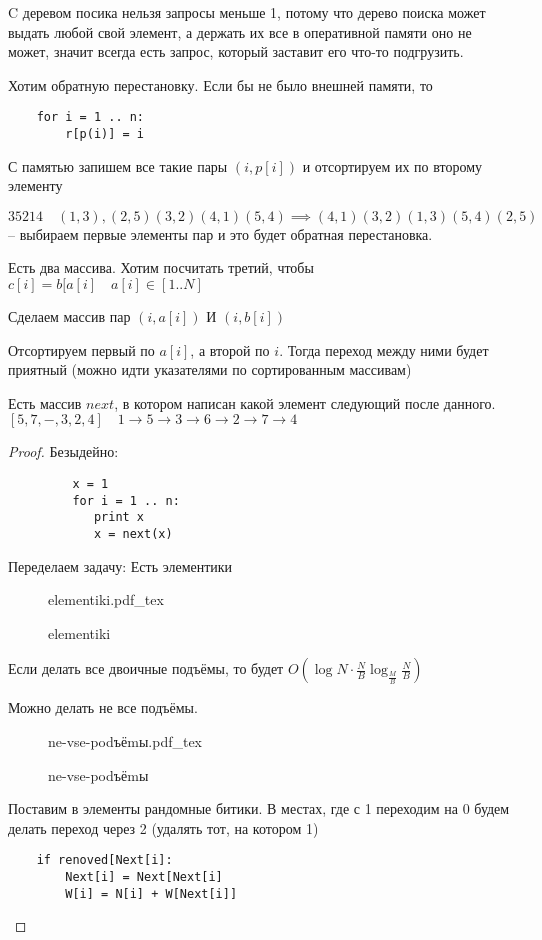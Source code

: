 \documentclass{book}
\theoremstyle{definition}
\newcommand{\incfig}[1]{%
    \def\svgwidth{\columnwidth}
    {#1.pdf_tex}
}
\begin{document}
C деревом посика нельзя запросы меньше 1, потому что дерево поиска может выдать любой свой элемент, а держать их все в оперативной памяти оно не может, значит всегда есть запрос, который заставит его что-то подгрузить.

Хотим обратную перестановку. Если бы не было внешней памяти, то
\begin{lstlisting}
    for i = 1 .. n:
        r[p(i)] = i
\end{lstlisting}


С памятью запишем все такие пары $(i, p[i])$ и отсортируем их по второму элементу

$35214\quad (1,3), (2,5)(3,2)(4,1)(5,4) \implies (4,1)(3,2)(1,3)(5,4)(2,5)$ -- выбираем первые элементы пар и это будет обратная перестановка.

Есть два массива. Хотим посчитать третий, чтобы $c[i] = b[a[i]\quad a[i]\in [1 .. N]$

Сделаем массив пар  $(i, a[i])$ И  $(i, b[i])$ 

Отсортируем первый по $a[i]$, а второй по  $i$. Тогда переход между ними будет приятный (можно идти указателями по сортированным массивам)


 \begin{problem}
     Есть массив $next$, в котором написан какой элемент следующий после данного.  $[5, 7, -, 3, 2, 4]\quad 1 \to 5\to 3\to 6\to 2\to 7\to 4$

\end{problem}   
\begin{proof}
     Безыдейно:
     \begin{lstlisting}
         x = 1
         for i = 1 .. n:
            print x
            x = next(x)
     \end{lstlisting}

     Переделаем задачу: Есть элементики
     
     
\begin{figure}[!ht]
    \centering
    \incfig{elementiki}
    \caption{elementiki}
    \label{fig:elementiki}
\end{figure}

Если делать все двоичные подъёмы, то будет $O\left( \log N \cdot  \frac{N}{B}\log _{\frac{M}{B}}\frac{N}{B} \right) $ 

Можно делать не все подъёмы.


\begin{figure}[!ht]
    \centering
    \incfig{ne-vse-podъёmы}
    \caption{ne-vse-podъёmы}
    \label{fig:ne-vse-podъёmы}
\end{figure}


Поставим в элементы рандомные битики. В местах, где с 1 переходим на 0 будем делать переход через 2 (удалять тот, на котором 1)

\begin{lstlisting}
    if renoved[Next[i]:
        Next[i] = Next[Next[i]
        W[i] = N[i] + W[Next[i]]
\end{lstlisting}

\end{proof}
\end{document}
